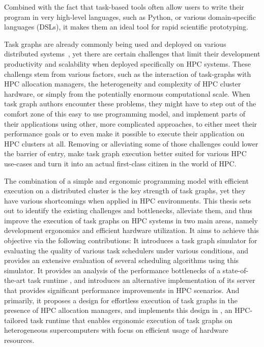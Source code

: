 Combined with the fact that task-based tools often allow users to write their program in very
high-level languages, such as Python, or various domain-specific languages (DSLs), it makes them an
ideal tool for rapid scientific prototyping.

Task graphs are already commonly being used and deployed on various distributed
systems~\cite{pegasus, workflows_at_scale, large_scale_modelling}, yet there are certain challenges that limit their development
productivity and scalability when deployed specifically on HPC systems. These challengs stem from
various factors, such as the interaction of task-graphs with HPC allocation managers, the
heterogeneity and complexity of HPC cluster hardware, or simply from the potentially enormous
computational scale. When task graph authors encounter these problems, they might have to step out
of the comfort zone of this easy to use programming model, and implement parts of their
applications using other, more complicated approaches, to either meet their performance goals or to
even make it possible to execute their application on HPC clusters at all. Removing or alleviating
some of those challenges could lower the barrier of entry, make task graph execution better suited
for various HPC use-cases and turn it into an actual first-class citizen in the world of HPC\@.

The combination of a simple and ergonomic programming model with efficient execution on a
distributed cluster is the key strength of task graphs, yet they have various shortcomings when
applied in HPC environments. This thesis sets out to identify the existing challenges and
bottlenecks, alleviate them, and thus improve the execution of task graphs on HPC systems in two
main areas, namely development ergonomics and efficient hardware utilization. It aims to achieve
this objective via the following contributions: It introduces a task graph simulator for evaluating
the quality of various task schedulers under various conditions, and provides an extensive
evaluation of several scheduling algorithms using this simulator. It provides an analysis of the
performance bottlenecks of a state-of-the-art task runtime \dask{}, and introduces
an alternative implementation of its server that provides significant performance improvements in
HPC scenarios. And primarily, it proposes a design for effortless execution of task graphs in the
presence of HPC allocation managers, and implements this design in \hyperqueue{}, an
HPC-tailored task runtime that enables ergonomic execution of task graphs on heterogeneous
supercomputers with focus on efficient usage of hardware resources.

